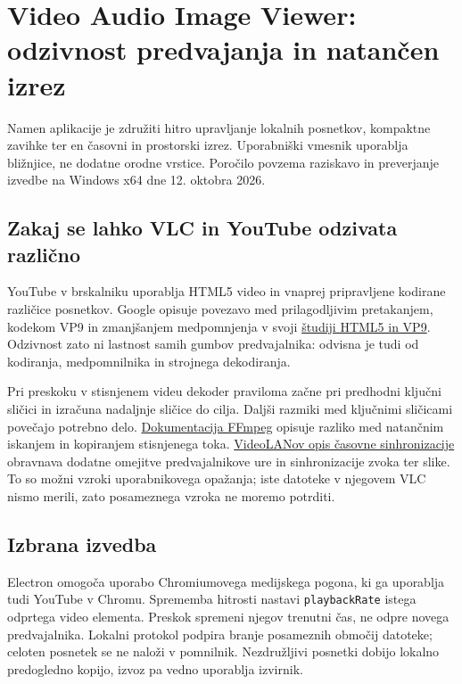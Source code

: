 \documentclass[12pt,a4paper]{article}
\begin{document}
\section*{Video Audio Image Viewer: odzivnost predvajanja in natančen izrez}

Namen aplikacije je združiti hitro upravljanje lokalnih posnetkov, kompaktne zavihke ter en časovni in prostorski izrez. Uporabniški vmesnik uporablja bližnjice, ne dodatne orodne vrstice. Poročilo povzema raziskavo in preverjanje izvedbe na Windows x64 dne 12. oktobra 2026.

\subsection*{Zakaj se lahko VLC in YouTube odzivata različno}

YouTube v brskalniku uporablja HTML5 video in vnaprej pripravljene kodirane različice posnetkov. Google opisuje povezavo med prilagodljivim pretakanjem, kodekom VP9 in zmanjšanjem medpomnjenja v svoji \href{https://developers.google.com/media/pdf/Youtube-HTML5-VP9-Case-Study.pdf}{študiji HTML5 in VP9}. Odzivnost zato ni lastnost samih gumbov predvajalnika: odvisna je tudi od kodiranja, medpomnilnika in strojnega dekodiranja.

Pri preskoku v stisnjenem videu dekoder praviloma začne pri predhodni ključni sličici in izračuna nadaljnje sličice do cilja. Daljši razmiki med ključnimi sličicami povečajo potrebno delo. \href{https://ffmpeg.org/ffmpeg.html}{Dokumentacija FFmpeg} opisuje razliko med natančnim iskanjem in kopiranjem stisnjenega toka. \href{https://github.com/videolan/vlc/blob/master/doc/clock.md}{VideoLANov opis časovne sinhronizacije} obravnava dodatne omejitve predvajalnikove ure in sinhronizacije zvoka ter slike. To so možni vzroki uporabnikovega opažanja; iste datoteke v njegovem VLC nismo merili, zato posameznega vzroka ne moremo potrditi.

\subsection*{Izbrana izvedba}

Electron omogoča uporabo Chromiumovega medijskega pogona, ki ga uporablja tudi YouTube v Chromu. Sprememba hitrosti nastavi \texttt{playbackRate} istega odprtega video elementa. Preskok spremeni njegov trenutni čas, ne odpre novega predvajalnika. Lokalni protokol podpira branje posameznih območij datoteke; celoten posnetek se ne naloži v pomnilnik. Nezdružljivi posnetki dobijo lokalno predogledno kopijo, izvoz pa vedno uporablja izvirnik.
\end{document}
